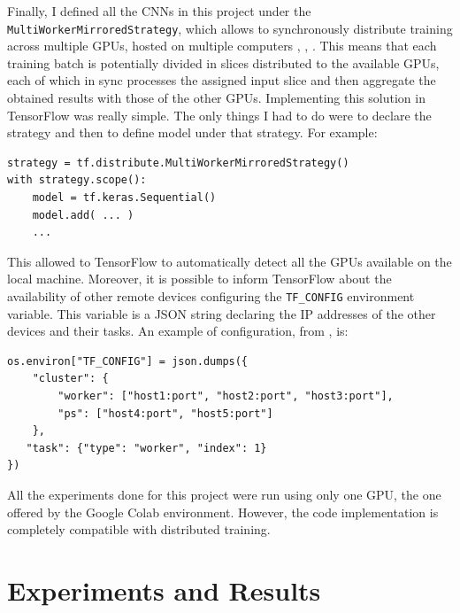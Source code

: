 \documentclass{article}
\begin{document}
Finally, I defined all the CNNs in this project under the \texttt{Multi\-Worker\-Mirrored\-Strategy}, which allows to synchronously distribute training across multiple GPUs, hosted on multiple computers  \cite{distr_training_guide}, \cite{distr_training_blog}, \cite{distr_training_tutorial}.
This means that each training batch is potentially divided in slices distributed to the available GPUs, each of which in sync processes the assigned input slice and then aggregate the obtained results with those of the other GPUs.
Implementing this solution in TensorFlow was really simple.
The only things I had to do were to declare the strategy and then to define model under that strategy.
For example:
\begin{verbatim}
strategy = tf.distribute.MultiWorkerMirroredStrategy()
with strategy.scope():
    model = tf.keras.Sequential()
    model.add( ... )
    ...
\end{verbatim}
This allowed to TensorFlow to automatically detect all the GPUs available on the local machine.
Moreover, it is possible to inform TensorFlow about the availability of other remote devices configuring the \texttt{TF\_CONFIG} environment variable.
This variable is a JSON string declaring the IP addresses of the other devices and their tasks.
An example of configuration, from \cite{distr_training_guide}, is:
\begin{verbatim}
os.environ["TF_CONFIG"] = json.dumps({
    "cluster": {
        "worker": ["host1:port", "host2:port", "host3:port"],
        "ps": ["host4:port", "host5:port"]
    },
   "task": {"type": "worker", "index": 1}
})
\end{verbatim}

\noindent All the experiments done for this project were run using only one GPU, the one offered by the Google Colab environment.
However, the code implementation is completely compatible with distributed training.


\section{Experiments and Results}
\label{experiments}
\end{document}
